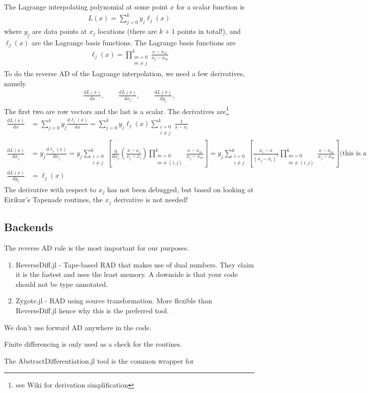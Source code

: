 \documentclass[10pt]{article}
\newcommand{\dd}[2]{\frac{\textrm{d} #1}{\textrm{d} #2}}
\newcommand{\ben}{\begin{eqnarray*}}
\newcommand{\een}{\end{eqnarray*}}
\newcommand{\beq}{\begin{equation}\begin{aligned}}
\newcommand{\eeq}{\end{aligned}\end{equation}}
\newcommand{\tn}[1]{\textrm{#1}}
\begin{document}
The Lagrange interpolating polynomial at some point $x$ for a scalar function is
\beq
L(x) = \sum_{j=0}^{k} y_j \ell_j(x)
\eeq
where $y_j$ are data points at $x_j$ locations (there are $k+1$ points in total!), and $\ell_j(x)$ are the Lagrange basis functions.
The Lagrange basis functions are
\beq
\ell_j(x) = \prod_{\substack{m=0 \\ m \neq j}}^{k} \frac{x-x_m}{x_j-x_m}
\eeq
To do the reverse AD of the Lagrange interpolation, we need a few derivatives, namely
\ben
\dd{L(x)}{x},
\qquad
\dd{L(x)}{x_j},
\qquad
\dd{L(x)}{y_j},
\een
The first two are row vectors and the last is a scalar.
The derivatives are\footnote{see Wiki for derivation simplification}
\beq
\dd{L(x)}{x} &= \sum_{j=0}^{k} y_j \dd{\ell_j(x)}{x} 
= 
\sum_{j=0}^{k} y_j { \ell_j(x) \sum_{\substack{i=0\\i\neq j}}^{k} \frac{1}{x - x_i}}
\\
\dd{L(x)}{x_j} &=  y_j \dd{\ell_j(x)}{x_j} = 
 y_j \sum_{\substack{i=0 \\ i \neq j}}^{k} \left[ 
    \dd{}{x_j}\left(
\frac{x-x_i}{x_j-x_i}
    \right) 
    \prod_{\substack{m=0 \\m\neq (i,j)}}^{k} \frac{x-x_m}{x_j-x_m}
    \right]
=
 y_j \sum_{\substack{i=0 \\ i \neq j}}^{k} \left[ 
    \frac{x_i - x}{(x_j-x_i)^2} \prod_{\substack{m=0 \\m\neq (i,j)}}^{k} \frac{x-x_m}{x_j-x_m}
    \right]
    \tn{(this is a vector)}
\\
\dd{L(x)}{y_j} &=  \ell_j(x)
\eeq
The derivative with respect to $x_j$ has not been debugged, but based on looking at Eirikur's Tapenade routines, the $x_j$ derivative is not needed!

\subsection{Backends}

The reverse AD rule is the most important for our purposes.

\begin{enumerate}
    \item ReverseDiff.jl - Tape-based RAD that makes use of dual numbers. They claim it is the fastest and uses the least memory. A downside is that your code should not be type annotated.
    \item Zygote.jl - RAD using source transformation. More flexible than ReverseDiff.jl hence why this is the preferred tool.
\end{enumerate}

We don't use forward AD anywhere in the code.

Finite differencing is only used as a check for the routines.

The AbstractDifferentiation.jl tool is the common wrapper for


\onecolumn
\appendix

\end{document}

